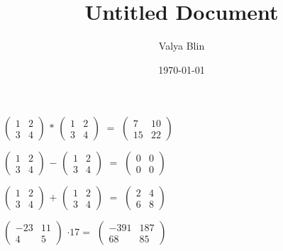 \documentclass[12pt]{article}
\title{Untitled Document}
\author{Valya Blin}
\date{\today}
\begin{document}
$\begin{pmatrix}
1 & 2\\
3 & 4
\end{pmatrix}$
%
$*$
$\begin{pmatrix}
1 & 2\\
3 & 4
\end{pmatrix}$
%
$=$
$\begin{pmatrix}
7 & 10\\
15 & 22
\end{pmatrix}$
%


$\begin{pmatrix}
1 & 2\\
3 & 4
\end{pmatrix}$
%
$-$
$\begin{pmatrix}
1 & 2\\
3 & 4
\end{pmatrix}$
%
$=$
$\begin{pmatrix}
0 & 0\\
0 & 0
\end{pmatrix}$
%


$\begin{pmatrix}
1 & 2\\
3 & 4
\end{pmatrix}$
%
$+$
$\begin{pmatrix}
1 & 2\\
3 & 4
\end{pmatrix}$
%
$=$
$\begin{pmatrix}
2 & 4\\
6 & 8
\end{pmatrix}$
%


$\begin{pmatrix}
-23 & 11\\
4 & 5
\end{pmatrix}$
%
$\cdot$$17$$=$
$\begin{pmatrix}
-391 & 187\\
68 & 85
\end{pmatrix}$
%
%
\end{document}
